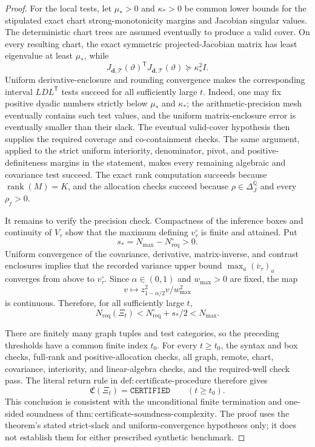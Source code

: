 \documentclass{article}
\begin{document}
\begin{proof}
For the local tests, let \(\mu_*>0\) and \(\kappa_*>0\) be common lower bounds for the stipulated exact chart strong-monotonicity margins and Jacobian singular values.  The deterministic chart trees are assumed eventually to produce a valid cover.  On every resulting chart, the exact symmetric projected-Jacobian matrix has least eigenvalue at least \(\mu_*\), while
\[
 J_{\boldsymbol d,\mathcal T}(\vartheta)^{\mathsf T}
 J_{\boldsymbol d,\mathcal T}(\vartheta)
 \succeq \kappa_*^2 I.
\]
Uniform derivative-enclosure and rounding convergence makes the corresponding interval \(LDL^{\mathsf T}\) tests succeed for all sufficiently large \(t\).  Indeed, one may fix positive dyadic numbers strictly below \(\mu_*\) and \(\kappa_*\); the arithmetic-precision mesh eventually contains such test values, and the uniform matrix-enclosure error is eventually smaller than their slack.  The eventual valid-cover hypothesis then supplies the required coverage and co-containment checks.  The same argument, applied to the strict uniform interiority, denominator, pivot, and positive-definiteness margins in the statement, makes every remaining algebraic and covariance test succeed.  The exact rank computation succeeds because \(\operatorname{rank}(M)=K\), and the allocation checks succeed because \(\rho\in\Delta_J^{\mathbb Q}\) and every \(\rho_j>0\).

It remains to verify the precision check.  Compactness of the inference boxes and continuity of \(V_\tau\) show that the maximum defining \(v_\tau^\circ\) is finite and attained.  Put
\[
 s_*=N_{\max}-N_{\mathrm{req}}^\circ>0.
\]
Uniform convergence of the covariance, derivative, matrix-inverse, and contrast enclosures implies that the recorded variance upper bound \(\max_a(\overline v_\tau)_a\) converges from above to \(v_\tau^\circ\).  Since \(\alpha\in(0,1)\) and \(w_{\max}>0\) are fixed, the map
\[
 v\longmapsto z_{1-\alpha/2}^2v/w_{\max}^2
\]
is continuous.  Therefore, for all sufficiently large \(t\),
\[
 N_{\mathrm{req}}(\Xi_t)
 <N_{\mathrm{req}}^\circ+s_*/2
 <N_{\max}.
\]

There are finitely many graph tuples and test categories, so the preceding thresholds have a common finite index \(t_0\).  For every \(t\geq t_0\), the syntax and box checks, full-rank and positive-allocation checks, all graph, remote, chart, covariance, interiority, and linear-algebra checks, and the required-well check pass.  The literal return rule in \(\mathrm{def{:}certificate\text{-}procedure}\) therefore gives
\[
 \mathfrak C(\Xi_t)=\mathtt{CERTIFIED}\qquad(t\geq t_0).
\]
This conclusion is consistent with the unconditional finite termination and one-sided soundness of \(\mathrm{thm{:}certificate\text{-}soundness\text{-}complexity}\).  The proof uses the theorem's stated strict-slack and uniform-convergence hypotheses only; it does not establish them for either prescribed synthetic benchmark.
\end{proof}
\end{document}
